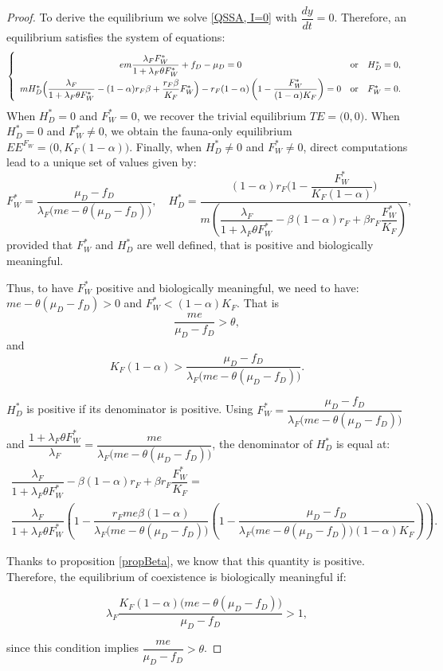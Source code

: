 \documentclass{article}
\newcommand{\lfw}{\lambda_{F}}
\newcommand{\lfw}{\lambda_{F}}
\begin{document}
\begin{proof}
To derive the equilibrium we solve \eqref{QSSA, I=0} with $\dfrac{d y}{dt} = 0$. Therefore, an equilibrium satisfies the system of equations:
\begin{equation}\label{systemEquilibre, I=0}
\def\arraystretch{2}
\left\lbrace \begin{array}{cll}
 e m \dfrac{\lfw F_W^*}{1 + \lfw \theta F_W^*} + f_D - \mu_D = 0& \mbox{or} & H_D^* = 0,\\
m H_D^*\Big(\dfrac{\lfw}{1 + \lfw \theta F_W^*} - (1-\alpha)r_F \beta + \dfrac{r_F \beta}{K_F}F_W^* \Big) - r_F(1-\alpha) \left(1- \dfrac{F_W^*}{(1-\alpha)K_F}\right)= 0& \mbox{or} & F^*_W = 0.
\end{array} \right.
\end{equation}
When $H_D^*=0$ and $F_W^*=0$, we recover the trivial equilibrium $TE = \Big(0,0\Big)$. When $H_D^*=0$ and $F_W^*\neq0$, we obtain the fauna-only equilibrium $EE^{F_W} = \Big(0, K_F(1-\alpha) \Big)$. Finally, when $H_D^*\neq0$ and $F_W^*\neq0$, direct computations lead to a unique set of values given by:
$$
F^*_{W} = \dfrac{\mu_D - f_D}{\lfw \big(me - \theta (\mu_D - f_D) \big)  },
\quad 
H^*_{D} = \dfrac{(1-\alpha)r_F\Big(1 - \dfrac{F^*_{W}}{K_F(1-\alpha)} \Big)}{m\left(\dfrac{\lfw}{1 + \lfw \theta F_W^*} - \beta (1-\alpha) r_F + \beta r_F  \dfrac{F^*_{W}}{K_F}\right)},
$$
provided that $F^*_W$ and $H_D^*$ are well defined, that is positive and biologically meaningful. 

Thus, to have $F^*_W$ positive and biologically meaningful, we need to have: $me - \theta (\mu_D - f_D) >0$ and  $ F_W^* < (1-\alpha) K_F$. That is
$$
\dfrac{me}{\mu_D - f_D} > \theta,
$$
and
$$
K_F(1-\alpha) > \dfrac{\mu_D - f_D}{ \lfw  \big(me - \theta (\mu_D - f_D) \big)}.
$$

$H_D^*$ is positive if its denominator is positive. Using $F^*_{W} = \dfrac{\mu_D - f_D}{\lfw \big(me - \theta (\mu_D - f_D) \big)  }$ and $\dfrac{1 + \lfw \theta F_W^*}{\lfw} = \dfrac{me}{\lfw \big(m e - \theta (\mu_D - f_D)\big)}$, the denominator of $H_D^*$ is equal at:
\begin{multline*}
\dfrac{\lfw}{1 + \lfw \theta F_W^*} - \beta (1-\alpha) r_F + \beta r_F  \dfrac{F^*_{W}}{K_F} = \\ \dfrac{\lfw}{1 + \lfw \theta F_W^*}\left(1 - \dfrac{r_F me \beta(1-\alpha)}{\lfw \big(m e - \theta (\mu_D - f_D)\big)}\left(1 - \dfrac{\mu_D - f_D}{\lfw \big(me - \theta (\mu_D - f_D) \big)(1-\alpha)K_F } \right)\right).
\end{multline*}

Thanks to proposition \ref{propBeta}, we know that this quantity is positive. Therefore, the equilibrium of coexistence is biologically meaningful if:

\begin{equation*}
\lfw \dfrac{ K_F(1-\alpha) \big(me - \theta (\mu_D - f_D) \big)}{\mu_D - f_D}> 1,
\end{equation*}

since this condition implies $\dfrac{me}{\mu_D - f_D} > \theta$.

\end{proof}
\end{document}
